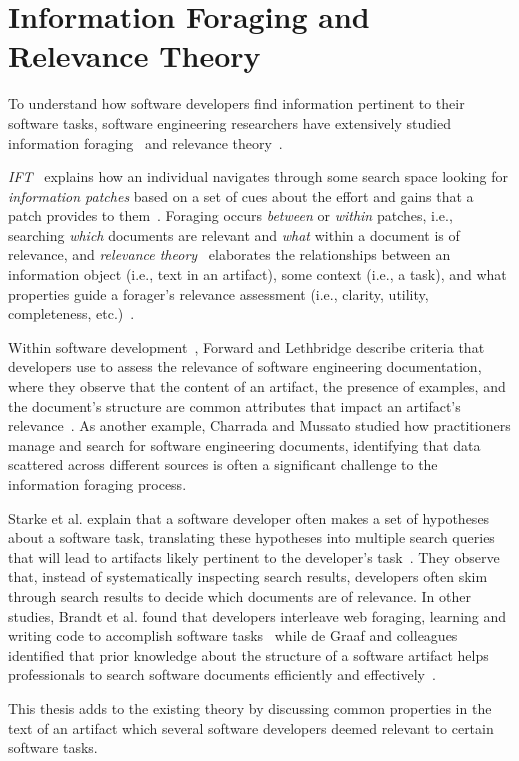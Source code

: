 \section{Information Foraging and Relevance Theory}
\label{cp2:foraging}




To understand how software developers find  information pertinent to their software tasks,
software engineering researchers have extensively studied information foraging~\cite{Pirolli1999}
and relevance theory~\cite{clark2013relevance, saracevic1975, Saracevic2007c, Saracevic2007b}.


\textit{\acf{IFT}}~\cite{Pirolli1999} explains how 
an individual navigates through some search space looking for \textit{information patches} based on 
a set of cues about the effort and gains that a patch provides to them~\cite{Pirolli1999}.
Foraging occurs \textit{between} or \textit{within} patches, i.e., 
searching \textit{which} documents are relevant and \textit{what} within a document is of relevance,
and \textit{relevance theory}~\cite{clark2013relevance, saracevic1975} elaborates the relationships between an information object (i.e., text in an artifact),
some context (i.e., a task), and what properties guide a forager's relevance assessment (i.e., clarity, utility, completeness, etc.)~\cite{Saracevic2007c}. 




Within software development~\cite{Piorkowski2015, Piorkowski2016, chi2007, Ko2006a},
 Forward and Lethbridge describe criteria that developers use to assess the relevance of software engineering documentation, where they observe that the content of an artifact, the presence of examples, and the document's structure are common attributes that impact an artifact's relevance~\cite{Forward2002}.
As another example, Charrada and Mussato studied how 
practitioners manage and search for software engineering documents, 
identifying that data scattered across different sources is 
often a significant challenge to the information foraging process.



Starke et al. explain that a software developer often makes a set of hypotheses about a software task,
translating these hypotheses into multiple search queries that will lead to artifacts likely pertinent to the developer's task~\cite{Starke2009}. 
They observe that, instead of systematically inspecting search results,
developers often skim through search results to decide which documents are of relevance. 
In other studies, Brandt et al. found that developers interleave web foraging, learning and writing code 
to accomplish software tasks~\cite{Brandt2009a} while de Graaf and colleagues 
identified that prior knowledge about the structure of a software artifact helps professionals
to search software documents efficiently and effectively~\cite{DeGraaf2014}.


This thesis adds to the existing theory by discussing 
common properties in the text of an artifact which several software developers deemed relevant 
to certain software tasks.  

